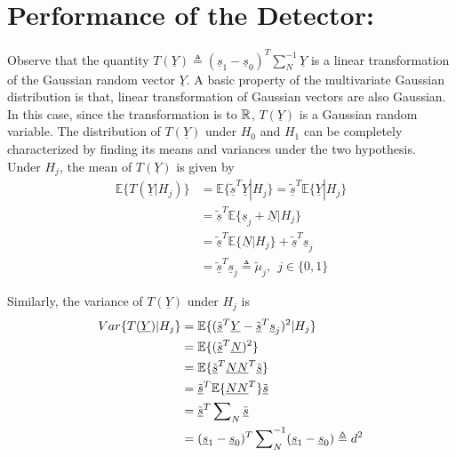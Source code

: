 \documentclass[a4paper,english,12pt]{article}
\begin{document}
\section{Performance of the Detector:}
Observe that the quantity
$
T(\underline{Y}) \triangleq (\underline{s}_1-\underline{s}_0)^T \sum\nolimits_N^{-1}\underline{Y}
$ 
is a linear transformation of the Gaussian random vector $\underline{Y}$. A basic property of the multivariate Gaussian distribution is that, linear transformation of Gaussian vectors are also Gaussian. In this case, since the transformation is to $\mathbb{R}$, $T(\underline{Y})$ is a Gaussian random variable. The distribution of $T(\underline{Y})$ under $H_0$ and $H_1$ can be completely characterized by finding its means and variances under the two hypothesis.\\
Under $H_j$, the mean of $T(\underline{Y})$ is given by
\begin{align}
\mathbb{E} \{ T(\underline{Y} | H_j) \} &= \mathbb{E}\{\tilde{\underline{s}}^T\underline{Y} | H_j \} = \tilde{\underline{s}}^T \mathbb{E}\{ \underline{Y} | H_j \} \nonumber  \\
  &= \tilde{\underline{s}}^T \mathbb{E} \{\underline{s}_j + \underline{N} |H_j \} \nonumber \\
 &=\tilde{\underline{s}}^T \mathbb{E} \{\underline{N}|H_j \} + \tilde{\underline{s}}^T\underline{s}_j \nonumber \\
  &= \tilde{\underline{s}}^T\underline{s}_j \triangleq \tilde{\mu}_j, \ \ j \in \{ 0,1 \} 
 \label{pd}
\end{align}   

 Similarly, the variance of $T(\underline{Y})$ under $H_j$ is 
\begin{align}
Var\{T(\underline{Y} )| H_j\} & = \mathbb{E} \{(\tilde{\underline{s}}^T \underline{Y} - \tilde{\underline{s}}^T \underline{s}_j)^2 | H_j \} \nonumber \\
& =\mathbb{E}\{(\tilde{\underline{s}}^T \underline{N})^2 \} \nonumber \\
& =\mathbb{E}\{\tilde{\underline{s}}^T \underline{N}\underline{N}^T \tilde{\underline{s}} \} \nonumber \\
& = \tilde{\underline{s}}^T \mathbb{E} \{\underline{N}\underline{N}^T \} \tilde{\underline{s}} \nonumber \\
& =\tilde{\underline{s}}^T \sum\nolimits_N \tilde{\underline{s}} \nonumber \\ 
 & = (\underline{s}_1-\underline{s}_0)^T \sum\nolimits _N^{-1} (\underline{s}_1-\underline{s}_0)  \triangleq d^2
\end{align}
\end{document}
